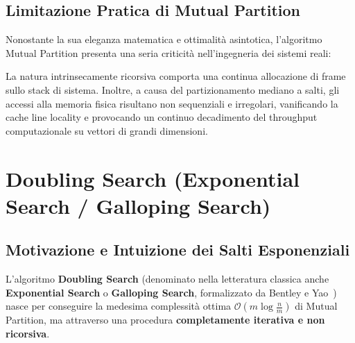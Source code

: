 \subsection{Limitazione Pratica di Mutual Partition}
Nonostante la sua eleganza matematica e ottimalità asintotica, l'algoritmo Mutual Partition presenta una seria criticità nell'ingegneria dei sistemi reali:
\begin{center}
\end{center}
La natura intrinsecamente ricorsiva comporta una continua allocazione di frame sullo stack di sistema. Inoltre, a causa del partizionamento mediano a salti, gli accessi alla memoria fisica risultano non sequenziali e irregolari, vanificando la cache line locality e provocando un continuo decadimento del throughput computazionale su vettori di grandi dimensioni.

\FloatBarrier
\section{Doubling Search (Exponential Search / Galloping Search)}
\label{sec:doubling-search}

\subsection{Motivazione e Intuizione dei Salti Esponenziali}
L'algoritmo \textbf{Doubling Search} (denominato nella letteratura classica anche \textbf{Exponential Search} o \textbf{Galloping Search}, formalizzato da Bentley e Yao~\cite{bentley1976}) nasce per conseguire la medesima complessità ottima $\mathcal{O}(m \log \frac{n}{m})$ di Mutual Partition, ma attraverso una procedura \textbf{completamente iterativa e non ricorsiva}.

